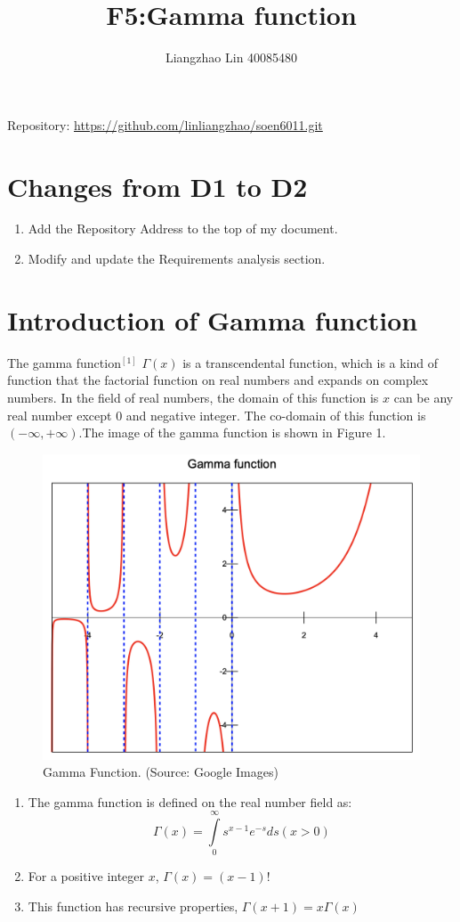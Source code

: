 \documentclass[12pt]{extarticle}
\title{F5:Gamma function}
\date{}
\author{Liangzhao Lin 40085480}
\newcommand{\<}{\langle}
\renewcommand{\>}{\rangle}
\theoremstyle{definition}
\begin{document}
\maketitle
\centerline {Repository: \url{https://github.com/linliangzhao/soen6011.git}}
\section{Changes from D1 to D2}
\begin{enumerate}[(1)]
\item Add the Repository Address to the top of my document.
\item Modify and update the Requirements analysis section.
\end{enumerate}

\section{Introduction of Gamma function }
\setlength{\parindent}{2em}
The gamma function$^{[1]}$ $\Gamma \left( x \right)$ is a transcendental function, which is a kind of function that the factorial function on real numbers and expands on complex numbers.
\newline
\indent
In the field of real numbers, the domain of this function is $x$ can be any real number except 0 and negative integer. The co-domain of this function is $(-{\infty},+{\infty}).$The image of the gamma function is shown in Figure 1.
\begin{figure}[ht]

\centering
\includegraphics[scale=0.3]{gammafunction.png}
\caption{Gamma Function.  (Source: Google Images)}
\label{fig:label}
\end{figure}
\begin{enumerate}[(1)]

\item The gamma function is defined on the real number field as:$$\Gamma \left( x \right) = \int\limits_0^\infty {s^{x - 1} e^{ - s} ds}(x>0)$$
\item For a positive integer $x$, $\Gamma \left( x \right) = (x-1)!$
\item This function has recursive properties,  $\Gamma \left( x+1 \right) = x\Gamma\left( x \right) $
\end{enumerate}
\end{document}

